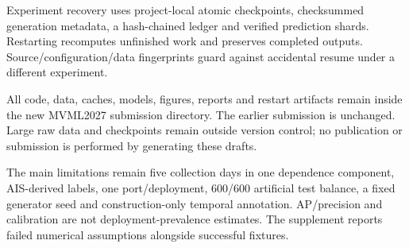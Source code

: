 \documentclass[11pt,letterpaper]{article}
\begin{document}
Experiment recovery uses project-local atomic checkpoints, checksummed generation metadata, a hash-chained ledger and verified prediction shards. Restarting recomputes unfinished work and preserves completed outputs. Source/configuration/data fingerprints guard against accidental resume under a different experiment.\par

All code, data, caches, models, figures, reports and restart artifacts remain inside the new MVML2027 submission directory. The earlier submission is unchanged. Large raw data and checkpoints remain outside version control; no publication or submission is performed by generating these drafts.\par

The main limitations remain five collection days in one dependence component, AIS-derived labels, one port/deployment, 600/600 artificial test balance, a fixed generator seed and construction-only temporal annotation. AP/precision and calibration are not deployment-prevalence estimates. The supplement reports failed numerical assumptions alongside successful fixtures.\par

{\fontsize{9}{11}\selectfont





}
\end{document}
